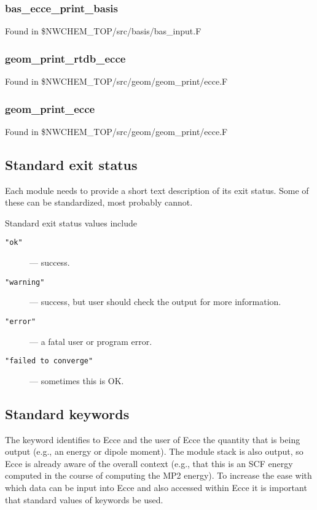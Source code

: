 \subsubsection{ bas\_ecce\_print\_basis }
Found in \$NWCHEM\_TOP/src/basis/bas\_input.F

\subsubsection{ geom\_print\_rtdb\_ecce }
Found in \$NWCHEM\_TOP/src/geom/geom\_print/ecce.F

\subsubsection{ geom\_print\_ecce }
Found in \$NWCHEM\_TOP/src/geom/geom\_print/ecce.F

\subsection{Standard exit status}

Each module needs to provide a short text description of its exit
status.  Some of these can be standardized, most probably cannot.

Standard exit status values include

\begin{description}
\item [\texttt{"ok"}] --- success.
\item [\texttt{"warning"}] --- success, but user should check the output for
  more information.
\item [\texttt{"error"}] --- a fatal user or program error.
\item [\texttt{"failed to converge"}] --- sometimes this is OK.
\end{description}

\subsection{Standard keywords}

The keyword identifies to Ecce and the user of Ecce the quantity
that is being output (e.g., an energy or dipole moment).  The module
stack is also output, so Ecce is already aware of the overall context
(e.g., that this is an SCF energy computed in the course of computing
the MP2 energy).  To increase the ease with which data can be input
into Ecce and also accessed within Ecce it is important that
standard values of keywords be used.

